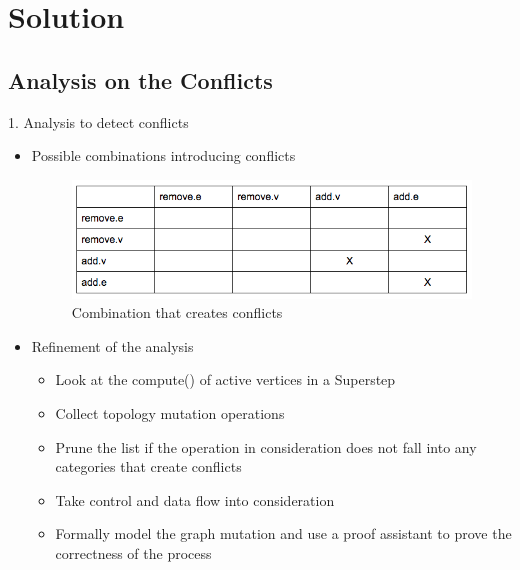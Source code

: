 \section{Solution}

\subsection{Analysis on the Conflicts}

\begin{frame}
	1. Analysis to detect conflicts
	\begin{itemize}
		\item Possible combinations introducing conflicts
		\linebreak
			\begin{figure}
			\includegraphics[width=0.8\linewidth]{figures/table.jpg}
			\caption{Combination that creates conflicts}
			\end{figure}
	\end{itemize}
\end{frame}

\begin{frame}	
		 \begin{itemize}
		      \item Refinement of the analysis
		      \linebreak
		   	  \begin{itemize}
				\item Look at the compute() of active vertices in a Superstep 
				\item Collect topology mutation operations
				\item Prune the list if the operation in consideration does not fall into any categories that create conflicts
				\item Take control and data flow into consideration
				\item Formally model the graph mutation and use a proof assistant to prove the correctness of the process
		     	  \end{itemize}
		  \end{itemize}
\end{frame}

